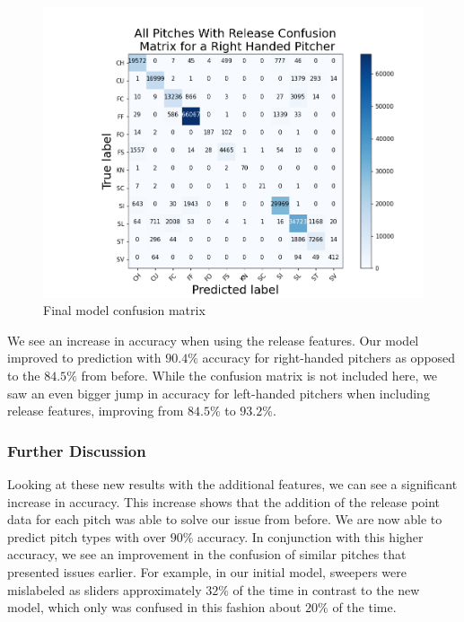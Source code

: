\documentclass{article}
\begin{document}
\begin{center}
  \begin{figure} [h!]
    \includegraphics[scale = .23]{FR-R.png}
    \caption{Final model confusion matrix}
  \end{figure}
\end{center}

We see an increase in accuracy when using the release features. Our model improved to prediction
with $90.4\%$ accuracy for right-handed pitchers as opposed to the $84.5\%$ from before. While the confusion matrix is not included
here, we saw an even bigger jump in accuracy for left-handed pitchers when including
release features, improving from $84.5\%$ to $93.2\%$.

\subsubsection{Further Discussion}

Looking at these new results with the additional features, we can see a significant increase in accuracy.
This increase shows that the addition of the release point data for each pitch was able to solve our issue
from before. We are now able to predict pitch types with over $90\%$ accuracy. In conjunction with this 
higher accuracy, we see an improvement in the confusion of similar pitches that presented issues earlier. 
For example, in our initial model, sweepers were mislabeled as sliders approximately $32\%$ of the time in contrast to 
the new model, which only was confused in this fashion about $20\%$ of the time. 
\end{document}
